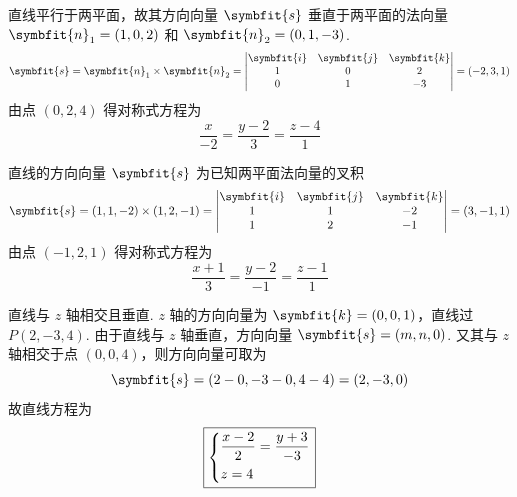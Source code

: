 \begin{solution}
    直线平行于两平面，故其方向向量 $\symbfit{s}$ 垂直于两平面的法向量 $\symbfit{n}_1 = (1, 0, 2)$ 和 $\symbfit{n}_2 = (0, 1, -3)$.
    \begin{equation}
        \symbfit{s} = \symbfit{n}_1 \times \symbfit{n}_2 =
        \begin{vmatrix}
            \symbfit{i} & \symbfit{j} & \symbfit{k} \\
            1           & 0           & 2           \\
            0           & 1           & -3
        \end{vmatrix} = (-2, 3, 1)
    \end{equation}
    由点 $(0, 2, 4)$ 得对称式方程为
    \begin{equation}
        \boxed{\frac{x}{-2} = \frac{y-2}{3} = \frac{z-4}{1}}
    \end{equation}

    直线的方向向量 $\symbfit{s}$ 为已知两平面法向量的叉积
    \begin{equation}
        \symbfit{s} = (1, 1, -2) \times (1, 2, -1) =
        \begin{vmatrix}
            \symbfit{i} & \symbfit{j} & \symbfit{k} \\
            1           & 1           & -2          \\
            1           & 2           & -1
        \end{vmatrix} = (3, -1, 1)
    \end{equation}
    由点 $(-1, 2, 1)$ 得对称式方程为
    \begin{equation}
        \boxed{\frac{x+1}{3} = \frac{y-2}{-1} = \frac{z-1}{1}}
    \end{equation}

    直线与 $z$ 轴相交且垂直. $z$ 轴的方向向量为 $\symbfit{k} = (0, 0, 1)$，直线过 $P(2, -3, 4)$.
    由于直线与 $z$ 轴垂直，方向向量 $\symbfit{s} = (m, n, 0)$. 又其与 $z$ 轴相交于点 $(0, 0, 4)$，则方向向量可取为
    \begin{equation}
        \symbfit{s} = (2-0, -3-0, 4-4) = (2, -3, 0)
    \end{equation}
    故直线方程为
    \begin{equation}
        \boxed{\begin{dcases} \frac{x-2}{2} = \frac{y+3}{-3} \\ z = 4 \end{dcases}}
    \end{equation}


\end{solution}
